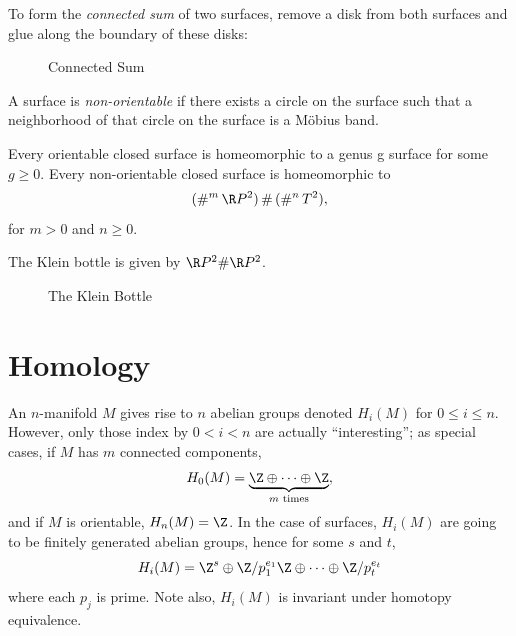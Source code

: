 \begin{definition}
    To form the \textit{connected sum} of two surfaces, remove a disk from both surfaces and glue along the boundary of these disks:
    \begin{figure}[H]
        \centering
        \caption{Connected Sum}
        \label{fig:connected-sum}
    \end{figure}
\end{definition}

\begin{definition}[Orientation]
    A surface is \textit{non-orientable} if there exists a circle on the surface such that a neighborhood of that circle on the surface is a M\"obius band.
\end{definition}

\begin{theorem}
    Every orientable closed surface is homeomorphic to a genus g surface for some $g \geq 0$. Every non-orientable closed surface is homeomorphic to \[(\#^m\, \R P^2) \,\#\, (\#^n\, T^2),\] for $m > 0$ and $n \geq 0$.
\end{theorem}

\begin{example}
    The Klein bottle is given by $\R P^2 \# \R P^2$.
    \begin{figure}[H]
        \centering
        \caption{The Klein Bottle}
        \label{fig:the-klein-bottle}
    \end{figure}
\end{example}

\vspace{.5cm}
\section{Homology}

An $n$-manifold $M$ gives rise to $n$ abelian groups denoted $H_i(M)$ for $0 \leq i \leq n$. However, only those index by $0 < i < n$ are actually ``interesting''; as special cases, if $M$ has $m$ connected components, \[H_0(M) = \underbrace{\Z \oplus \dots \oplus \Z}_{\text{$m$ times}},\] and if $M$ is orientable, $H_n(M) = \Z$. In the case of surfaces, $H_i(M)$ are going to be finitely generated abelian groups, hence for some $s$ and $t$, \[H_i(M) = \Z^s \oplus \Z/p_1^{e_1}\Z \oplus \dots \oplus \Z/p_t^{e_t}\] where each $p_j$ is prime. Note also, $H_i(M)$ is invariant under homotopy equivalence.

